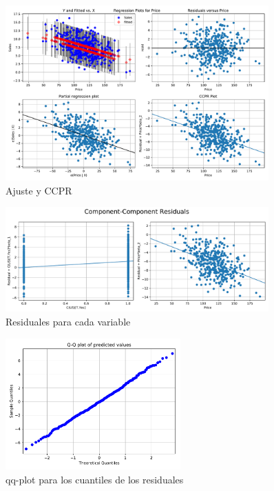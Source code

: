 \documentclass[11pt]{article}
\begin{document}
\begin{figure}[H]
    \centering
    \includegraphics[width = 0.9\textwidth]{1-regdiag.pdf}
    \caption{Ajuste y CCPR}
    \label{fig:1-restimeplot}
\end{figure}
\begin{figure}[H]
    \centering
    \includegraphics[width = 0.9\textwidth]{1-compcomp.pdf}
    \caption{Residuales para cada variable}
    \label{fig:1-compcomp}
\end{figure}
\begin{figure}[H]
    \centering
    \includegraphics[width = 0.6\textwidth]{1-qqplot.pdf}
    \caption{qq-plot para los cuantiles de los residuales}
    \label{fig:1-qqplot}
\end{figure}
\end{document}
